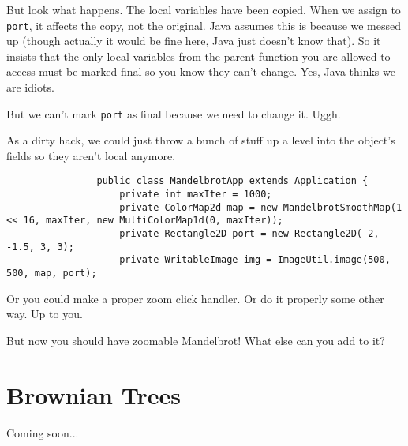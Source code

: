 \documentclass{article}
\begin{document}
            But look what happens. The local variables have been copied. When we assign to \texttt{port}, it affects the copy, not the
            original. Java assumes this is because we messed up (though actually it would be fine here, Java just doesn't know that). So it
            insists that the only local variables from the parent function you are allowed to access must be marked final so you know they
            can't change. Yes, Java thinks we are idiots.
            
            But we can't mark \texttt{port} as final because we need to change it. Uggh.
            
            As a dirty hack, we could just throw a bunch of stuff up a level into the object's fields so they aren't local anymore.
            
            \begin{verbatim}
                public class MandelbrotApp extends Application {
                    private int maxIter = 1000;
                    private ColorMap2d map = new MandelbrotSmoothMap(1 << 16, maxIter, new MultiColorMap1d(0, maxIter));
                    private Rectangle2D port = new Rectangle2D(-2, -1.5, 3, 3);
                    private WritableImage img = ImageUtil.image(500, 500, map, port);
            \end{verbatim}
            
            Or you could make a proper zoom click handler. Or do it properly some other way.  Up to you.
            
            But now you should have zoomable Mandelbrot!  What else can you add to it?

    \newpage
    \section{Brownian Trees}
        Coming soon...
        
\end{document}

